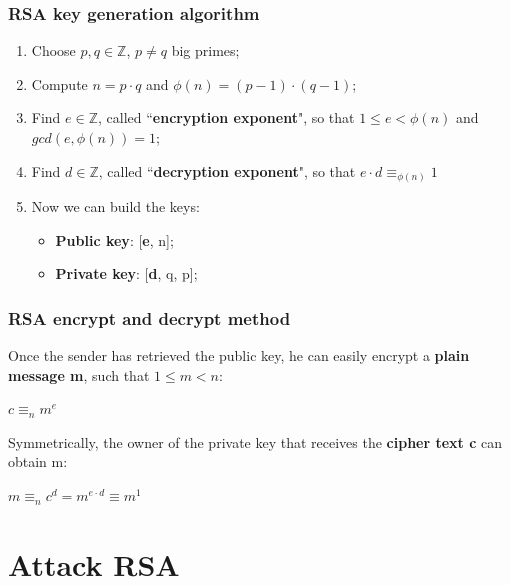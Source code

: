 \documentclass{beamer}
\begin{document}
  \begin{frame}
  \frametitle{RSA key generation algorithm}
    
    \begin{enumerate}
    \item Choose \textbf{$p, q \in \mathbb{Z}$}, $p \neq q$ big primes;
    \item Compute $n = p \cdot q$ and $\phi(n) = (p-1) \cdot (q-1)$;
    \item Find $e \in \mathbb{Z}$, called ``\textbf{encryption exponent}", so that $1 \leq e < \phi(n)$ and $gcd(e, \phi(n)) = 1$;
    \item Find $d \in \mathbb{Z}$, called ``\textbf{decryption exponent}", so that $e \cdot d \equiv_{\phi(n)} 1$
    \item Now we can build the keys:
    \begin{itemize}
    	\item \textbf{Public key}: [\textbf{e}, n];
    	\item \textbf{Private key}: [\textbf{d}, q, p];
    \end{itemize}
    \end{enumerate}
    
  \end{frame}
  
  \begin{frame}
  \frametitle{RSA encrypt and decrypt method}
    Once the sender has retrieved the public key, he can easily encrypt a \textbf{plain message m}, such that $1 \leq m < n$:\\
    
    \begin{center}
    $c \equiv_n {m}^{e}$
    \end{center}
    
    Symmetrically, the owner of the private key that receives the \textbf{cipher text c} can obtain m:
    
    \begin{center}
    $ m \equiv_n {c}^{d} = {m}^{e \cdot d} \equiv {m}^{1}$
    \end{center}
    
  \end{frame}
	
	
\section{Attack RSA}
\end{document}
